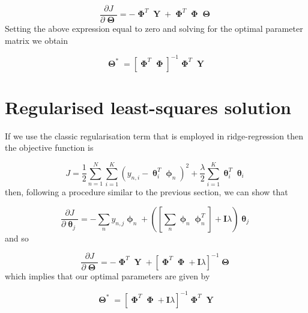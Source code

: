 \documentclass[a4paper, 11pt]{article}
\DeclareMathOperator{\Y}{\boldsymbol{Y}}
\DeclareMathOperator{\pa}{\boldsymbol{\theta}}
\DeclareMathOperator{\Pa}{\boldsymbol{\Theta}}
\DeclareMathOperator{\bphi}{\boldsymbol{\phi}}
\DeclareMathOperator{\bPhi}{\boldsymbol{\Phi}}
\begin{document}
\begin{equation}
	\frac{\partial J}{\partial \Pa} = 
	-\bPhi^T \Y + \bPhi^T\bPhi \Pa
\end{equation}
Setting the above expression equal to zero and solving for the optimal parameter matrix we obtain

\begin{equation}
	\Pa^* = \left[ \bPhi^T \bPhi \right]^{-1} \bPhi^T \Y
\end{equation}

\section{Regularised least-squares solution}
If we use the classic regularisation term that is employed in ridge-regression then the objective function is 

\begin{equation}
	J = \frac{1}{2} \sum_{n=1}^N \sum_{i=1}^K 
	\left(
		y_{n,i} - \pa_i^T \bphi_n
	\right)^2 + \frac{\lambda}{2} \sum_{i=1}^K \pa_i^T \pa_i
\end{equation}
then, following a procedure similar to the previous section, we can show that

\begin{equation}
	\frac{\partial J}{\partial \pa_j} = 
		- \sum_n y_{n,j} \bphi_n + \left(
			\left[
				\sum_n \bphi_n \bphi_n^T
			\right] + \boldsymbol{I} \lambda
		\right) \pa_j
\end{equation}
and so

\begin{equation}
	\frac{\partial J}{\partial \Pa} = - \bPhi^T\Y + 
	\left[
		\bPhi^T\bPhi + \boldsymbol{I} \lambda
	\right]^{-1} \Pa
\end{equation}
which implies that our optimal parameters are given by

\begin{equation}
	\Pa^* = \left[
		\bPhi^T \bPhi + \boldsymbol{I}\lambda
	\right]^{-1} \bPhi^T \Y
\end{equation}
\end{document}
